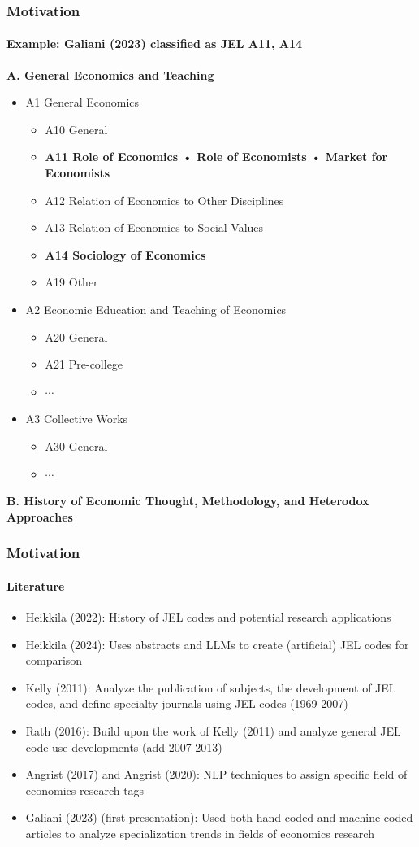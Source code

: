 \documentclass[aspectratio=1610]{beamer}
\begin{document}
\begin{frame}
	\frametitle{Motivation}
	\framesubtitle{Example: Galiani (2023) classified as JEL A11, A14}
	\textbf{A. General Economics and Teaching}
    \begin{itemize}
        \item A1 General Economics
        \begin{itemize}
            \item A10 General
            \item \textbf{A11 Role of Economics • Role of Economists • Market for Economists}
            \item A12 Relation of Economics to Other Disciplines
            \item A13 Relation of Economics to Social Values
            \item \textbf{A14 Sociology of Economics}
            \item A19 Other
        \end{itemize}
        \item A2 Economic Education and Teaching of Economics
        \begin{itemize}
            \item A20 General
            \item A21 Pre-college
            \item $\cdots$
        \end{itemize}
        \item A3 Collective Works
        \begin{itemize}
            \item A30 General
            \item $\cdots$
        \end{itemize}
    \end{itemize}
	\textbf{B. History of Economic Thought, Methodology, and Heterodox Approaches}
\end{frame}

\begin{frame}
	\frametitle{Motivation}
	\framesubtitle{Literature}
	\begin{itemize}
		\item Heikkila (2022): History of JEL codes and potential research applications
		\item Heikkila (2024): Uses abstracts and LLMs to create (artificial) JEL codes for comparison
		\item Kelly (2011): Analyze the publication of subjects, the development of JEL codes, and define specialty journals using JEL codes (1969-2007)
		\item Rath (2016): Build upon the work of Kelly (2011) and analyze general JEL code use developments (add 2007-2013)
		\item Angrist (2017) and Angrist (2020): NLP techniques to assign specific field of economics research tags
		\item Galiani (2023) (first presentation): Used both hand-coded and machine-coded articles to analyze specialization trends in fields of economics research
	\end{itemize}
\end{frame}
\end{document}
